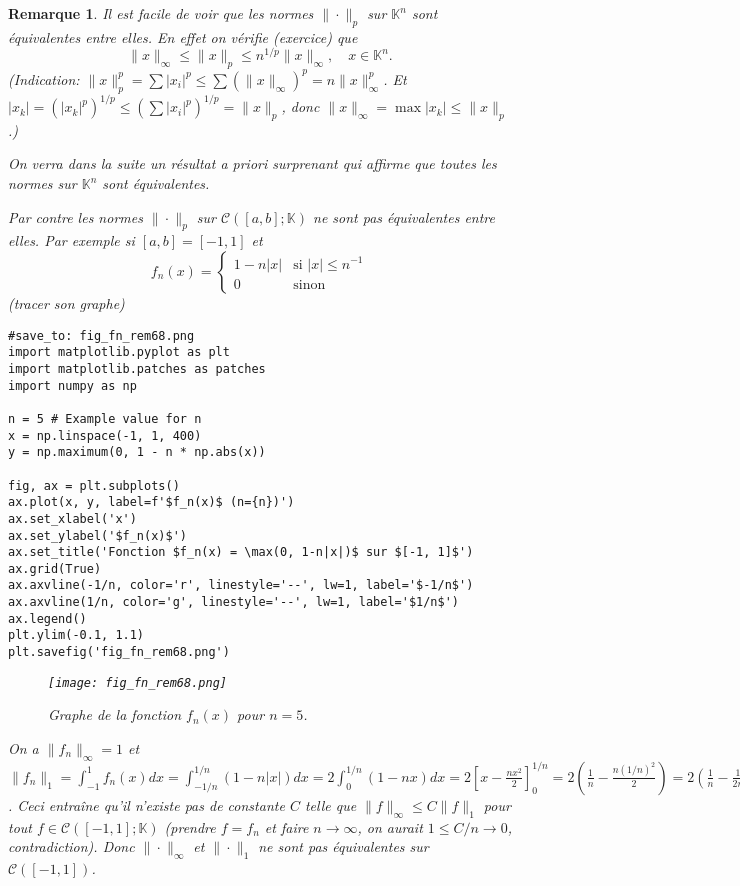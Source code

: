 \documentclass{article}
\newtheorem{remark}{Remarque}
\newcommand{\K}{\mathbb{K}}
\begin{document}
\begin{remark}
Il est facile de voir que les normes $\|\cdot\|_p$ sur $\K^n$ sont équivalentes entre elles. En effet on vérifie (exercice) que
\[ \|x\|_\infty \leq \|x\|_p \leq n^{1/p} \|x\|_\infty, \quad x \in \K^n. \]
(Indication: $\|x\|_p^p = \sum |x_i|^p \leq \sum (\|x\|_\infty)^p = n \|x\|_\infty^p$. Et $|x_k| = (|x_k|^p)^{1/p} \leq (\sum |x_i|^p)^{1/p} = \|x\|_p$, donc $\|x\|_\infty = \max |x_k| \leq \|x\|_p$.)

On verra dans la suite un résultat a priori surprenant qui affirme que toutes les normes sur $\K^n$ sont équivalentes.

Par contre les normes $\|\cdot\|_p$ sur $\mathcal{C}([a, b]; \K)$ ne sont pas équivalentes entre elles. Par exemple si $[a, b] = [-1, 1]$ et
\[
f_n(x) =
\begin{cases}
1 - n|x| & \text{si } |x| \leq n^{-1} \\
0 & \text{sinon}
\end{cases}
\]
(tracer son graphe)
\begin{verbatim}
#save_to: fig_fn_rem68.png
import matplotlib.pyplot as plt
import matplotlib.patches as patches
import numpy as np

n = 5 # Example value for n
x = np.linspace(-1, 1, 400)
y = np.maximum(0, 1 - n * np.abs(x))

fig, ax = plt.subplots()
ax.plot(x, y, label=f'$f_n(x)$ (n={n})')
ax.set_xlabel('x')
ax.set_ylabel('$f_n(x)$')
ax.set_title('Fonction $f_n(x) = \max(0, 1-n|x|)$ sur $[-1, 1]$')
ax.grid(True)
ax.axvline(-1/n, color='r', linestyle='--', lw=1, label='$-1/n$')
ax.axvline(1/n, color='g', linestyle='--', lw=1, label='$1/n$')
ax.legend()
plt.ylim(-0.1, 1.1)
plt.savefig('fig_fn_rem68.png')
\end{verbatim}

\begin{figure}[H]
    \centering
    \texttt{[image: fig\_fn\_rem68.png]}
    \caption{Graphe de la fonction $f_n(x)$ pour $n=5$.}
    \label{fig:fn_rem68}
\end{figure}

On a $\|f_n\|_\infty = 1$ et $\|f_n\|_1 = \int_{-1}^1 f_n(x) dx = \int_{-1/n}^{1/n} (1 - n|x|) dx = 2 \int_0^{1/n} (1 - nx) dx = 2 [x - \frac{nx^2}{2}]_0^{1/n} = 2 (\frac{1}{n} - \frac{n(1/n)^2}{2}) = 2 (\frac{1}{n} - \frac{1}{2n}) = \frac{1}{n}$.
Ceci entraîne qu'il n'existe pas de constante $C$ telle que $\|f\|_\infty \leq C \|f\|_1$ pour tout $f \in \mathcal{C}([-1, 1]; \K)$ (prendre $f = f_n$ et faire $n \to \infty$, on aurait $1 \leq C/n \to 0$, contradiction).
Donc $\|\cdot\|_\infty$ et $\|\cdot\|_1$ ne sont pas équivalentes sur $\mathcal{C}([-1, 1])$.
\end{remark}
\end{document}

